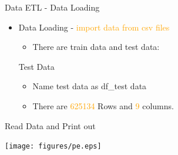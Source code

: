 \documentclass[
 size=14pt,
 paper=smartboard,  %
 mode=present, 		%
 display=slides, 	%
 style=tuliplab,  	%
 pauseslide,
 fleqn,leqno]{powerdot}
\begin{document}
\begin{slide}{Data ETL - Data Loading}
\begin{itemize}
\item
Data Loading - \textcolor{orange}{import data from csv files}

\begin{itemize}
\item
There are train data and test data:
\end{itemize}
\vspace{1cm}
{
Test Data
\begin{itemize}
\item
\smallskip
Name test data as df\_test data

\item
\smallskip
There are \textcolor{orange}{625134} Rows and \textcolor{orange}{9} columns.
\end{itemize}
}
\end{itemize}



\end{slide}



\begin{slide}{Read Data and Print out}
	{\begin{flushleft}
			\texttt{[image: figures/pe.eps]}
		\end{flushleft}
	}
\end{slide}
\end{document}
